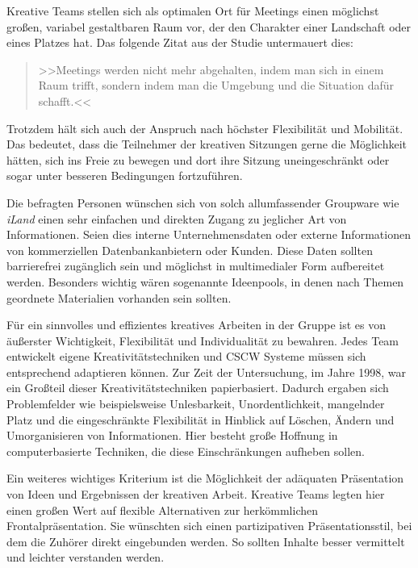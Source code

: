 Kreative Teams stellen sich als optimalen Ort für Meetings einen möglichst großen, variabel gestaltbaren Raum vor, der den Charakter einer Landschaft oder eines Platzes hat. Das folgende Zitat aus der Studie untermauert dies: 

\medskip\begin{quote}
	>>Meetings werden nicht mehr abgehalten, indem man sich in einem Raum trifft, sondern indem man die Umgebung und die Situation dafür schafft.<< 
\end{quote}
\begin{flushright}
	\citep{Streitz:1998p198}
\end{flushright}

\medskip Trotzdem hält sich auch der Anspruch nach höchster Flexibilität und Mobilität. Das bedeutet, dass die Teilnehmer der kreativen Sitzungen gerne die Möglichkeit hätten, sich ins Freie zu bewegen und dort ihre Sitzung uneingeschränkt oder sogar unter besseren Bedingungen fortzuführen.

Die befragten Personen wünschen sich von solch allumfassender Groupware wie \emph{iLand} einen sehr einfachen und direkten Zugang zu jeglicher Art von Informationen. Seien dies interne Unternehmensdaten oder externe Informationen von kommerziellen Datenbankanbietern oder Kunden. Diese Daten sollten barrierefrei zugänglich sein und möglichst in multimedialer Form aufbereitet werden. Besonders wichtig wären sogenannte Ideenpools, in denen nach Themen geordnete Materialien vorhanden sein sollten. 

Für ein sinnvolles und effizientes kreatives Arbeiten in der Gruppe ist es von äußerster Wichtigkeit, Flexibilität und Individualität zu bewahren. Jedes Team entwickelt eigene Kreativitätstechniken und CSCW Systeme müssen sich entsprechend adaptieren können. Zur Zeit der Untersuchung, im Jahre 1998, war ein Großteil dieser Kreativitätstechniken papierbasiert. Dadurch ergaben sich Problemfelder wie beispielsweise Unlesbarkeit, Unordentlichkeit, mangelnder Platz und die eingeschränkte Flexibilität in Hinblick auf Löschen, Ändern und Umorganisieren von Informationen. Hier besteht große Hoffnung in computerbasierte Techniken, die diese Einschränkungen aufheben sollen.

Ein weiteres wichtiges Kriterium ist die Möglichkeit der adäquaten Präsentation von Ideen und Ergebnissen der kreativen Arbeit. Kreative Teams legten hier einen großen Wert auf flexible Alternativen zur herkömmlichen Frontalpräsentation. Sie wünschten sich einen partizipativen Präsentationsstil, bei dem die Zuhörer direkt eingebunden werden. So sollten Inhalte besser vermittelt und leichter verstanden werden.

